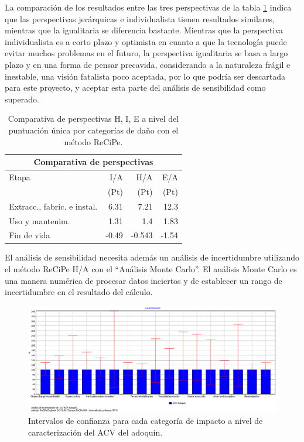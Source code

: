 La comparación de los resultados entre las tres perspectivas de la tabla \ref{comparativa_perspectivas} indica que las perspectivas jerárquicas e individualista tienen resultados similares, mientras que la igualitaria se diferencia bastante. Mientras que la perspectiva individualista es a corto plazo y optimista en cuanto a que la tecnología puede evitar muchos problemas en el futuro, la perspectiva igualitaria se basa a largo plazo y en una forma de pensar precavida, considerando a la naturaleza frágil e inestable, una visión fatalista poco aceptada, por lo que podría ser descartada para este proyecto, y aceptar esta parte del análisis de sensibilidad como superado.

\begin{table}[!htb]
\centering
\begin{tabular}{p{6cm}rrr}
\toprule
\multicolumn{4}{c}{Comparativa de perspectivas}\\
\midrule
Etapa & I/A & H/A & E/A\\
 & (Pt) & (Pt) & (Pt)\\
\midrule
Extracc., fabric. e instal. & 6.31 & 7.21 & 12.3\\
Uso y mantenim. & 1.31 & 1.4 & 1.83\\
Fin de vida & -0.49 & -0.543 & -1.54\\
\bottomrule
\end{tabular}
\caption{Comparativa de perspectivas H, I, E a nivel del puntuación única por categorías de daño con el método ReCiPe.}
\label{comparativa_perspectivas}
\end{table}

El análisis de sensibilidad necesita además un análisis de incertidumbre utilizando el método ReCiPe H/A con el ``Análisis Monte Carlo''. El análisis Monte Carlo es una manera numérica de procesar datos inciertos y de establecer un rango de incertidumbre en el resultado del cálculo.

\begin{figure}[!htb]
\centering
\includegraphics[width=15cm]{img/confianza_caracterizacion.png}
\caption{Intervalos de confianza para cada categoría de impacto a nivel de caracterización del ACV del adoquín.}
\label{fig:confianza_caracterizacion}
\end{figure}

